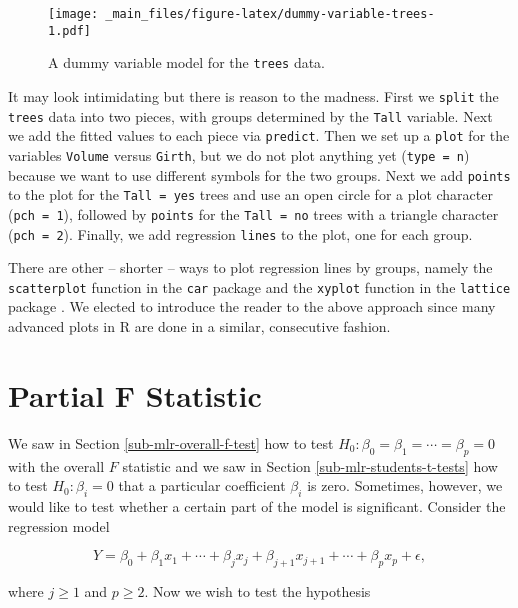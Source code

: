 \documentclass[]{book}
\numberwithin{equation}{chapter}
\numberwithin{figure}{chapter}
\theoremstyle{plain}
\theoremstyle{definition}
\theoremstyle{remark}
\theoremstyle{definition}
\theoremstyle{definition}
\theoremstyle{remark}
\begin{document}
\begin{figure}[htbp]
\centering
\texttt{[image: \_main\_files/figure-latex/dummy-variable-trees-1.pdf]}
\caption{\label{fig:dummy-variable-trees}\small A dummy variable model for the
\texttt{trees} data.}
\end{figure}




It may look intimidating but there is reason to the madness. First we
\texttt{split} the \texttt{trees} data into two pieces, with groups
determined by the \texttt{Tall} variable. Next we add the fitted values
to each piece via \texttt{predict}. Then we set up a \texttt{plot} for
the variables \texttt{Volume} versus \texttt{Girth}, but we do not plot
anything yet (\texttt{type\ =\ n}) because we want to use different
symbols for the two groups. Next we add \texttt{points} to the plot for
the \texttt{Tall\ =\ yes} trees and use an open circle for a plot
character (\texttt{pch\ =\ 1}), followed by \texttt{points} for the
\texttt{Tall\ =\ no} trees with a triangle character
(\texttt{pch\ =\ 2}). Finally, we add regression \texttt{lines} to the
plot, one for each group.

There are other -- shorter -- ways to plot regression lines by groups,
namely the \texttt{scatterplot} function in the \texttt{car} package
\autocite{car} and the \texttt{xyplot} function in the \texttt{lattice}
package \autocite{lattice}. We elected to introduce the reader to the
above approach since many advanced plots in R are done in a similar,
consecutive fashion.

\section{Partial F Statistic}\label{sec-partial-f-statistic}

We saw in Section \ref{sub-mlr-overall-f-test} how to test
\(H_{0}:\beta_{0}=\beta_{1}=\cdots=\beta_{p}=0\) with the overall \(F\)
statistic and we saw in Section \ref{sub-mlr-students-t-tests} how to
test \(H_{0}:\beta_{i}=0\) that a particular coefficient \(\beta_{i}\)
is zero. Sometimes, however, we would like to test whether a certain
part of the model is significant. Consider the regression model

\begin{equation}
Y=\beta_{0}+\beta_{1}x_{1}+\cdots+\beta_{j}x_{j}+\beta_{j+1}x_{j+1}+\cdots+\beta_{p}x_{p}+\epsilon,
\end{equation}

where \(j\geq1\) and \(p\geq2\). Now we wish to test the hypothesis
\end{document}
